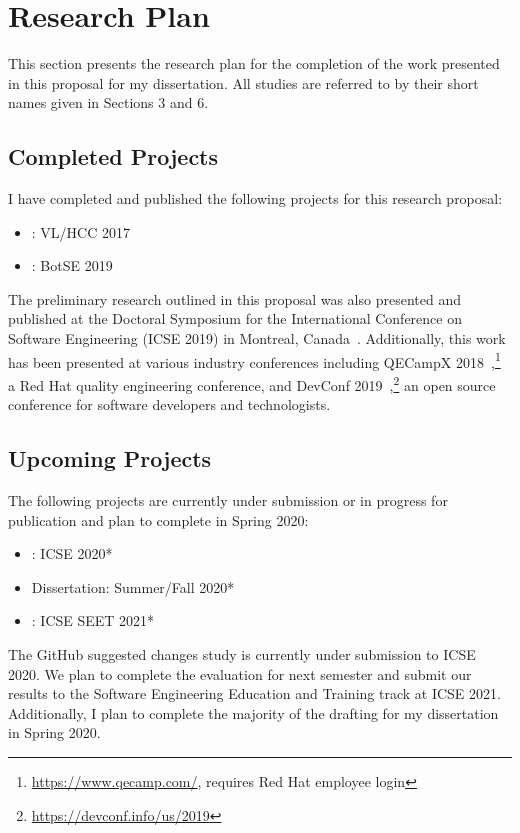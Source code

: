 \section{Research Plan}

This section presents the research plan for the completion of the work presented in this proposal for my dissertation. All studies are referred to by their short names given in Sections 3 and 6.

\subsection{Completed Projects}

I have completed and published the following projects for this research proposal:

\begin{itemize}
    \item[] \peer: VL/HCC 2017~\cite{VLHCC}
    \item[] \sorry: BotSE 2019~\cite{BotSE}
\end{itemize}

The preliminary research outlined in this proposal was also presented and published at the Doctoral Symposium for the International Conference on Software Engineering (ICSE 2019) in Montreal, Canada~\cite{Symposium}. Additionally, this work has been presented at various industry conferences including QECampX 2018~\cite{QECamp},\footnote{\url{https://www.qecamp.com/}, requires Red Hat employee login} a Red Hat quality engineering conference, and DevConf 2019~\cite{DevConf},\footnote{\url{https://devconf.info/us/2019}} an open source conference for software developers and technologists.

\subsection{Upcoming Projects}

The following projects are currently under submission or in progress for publication and plan to complete in Spring 2020:

\begin{itemize}
    \item[] \sugg: ICSE 2020*
    \item[] Dissertation: Summer/Fall 2020*
    \item[] \nudge: ICSE SEET 2021*
\end{itemize}

The GitHub suggested changes study is currently under submission to ICSE 2020. We plan to complete the evaluation for \TOOL next semester and submit our results to the Software Engineering Education and Training track at ICSE 2021. Additionally, I plan to complete the majority of the drafting for my dissertation in Spring 2020.

